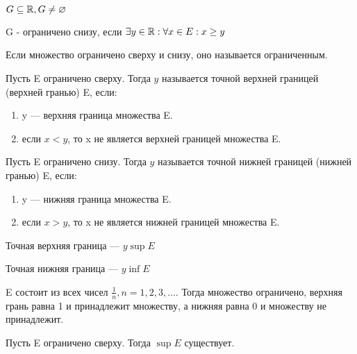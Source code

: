 \begin{definition}
    $G \subseteq \mathbb{R}, G \neq \varnothing$

    G - ограничено снизу, если $\exists y \in \mathbb{R}: \forall x \in E: x \geq y$
\end{definition}

\begin{remark}
    Если множество ограничено сверху и снизу, оно называется ограниченным.
\end{remark}

\begin{definition}
    Пусть E ограничено сверху. Тогда $y$ называется точной верхней границей (верхней гранью) E, если: 
    \begin{enumerate}
        \item y --- верхняя граница множества E.
        \item если $x < y$, то x не является верхней границей множества E.
    \end{enumerate}
\end{definition}

\begin{definition}
    Пусть E ограничено снизу. Тогда $y$ называется точной нижней границей (нижней гранью) E, если: 
    \begin{enumerate}
        \item y --- нижняя граница множества E.
        \item если $x > y$, то x не является нижней границей множества E.
    \end{enumerate}
\end{definition}

\begin{definition}
    Точная верхняя граница --- $y \sup E$

    Точная нижняя граница --- $y \inf E$
\end{definition}

\begin{eg}
    E состоит из всех чисел $\frac{1}{n}, n = 1, 2, 3, \ldots$. Тогда множество ограничено, верхняя грань равна 1 и принадлежит множеству, а нижняя равна 0 и множеству не принадлежит.
\end{eg}

\begin{theorem}
    Пусть E ограничено сверху. Тогда $\sup E$ существует.
\end{theorem}


